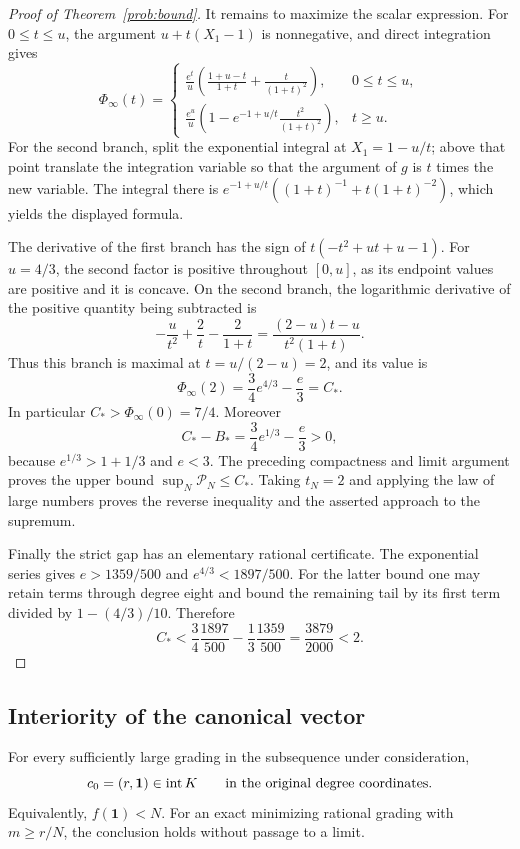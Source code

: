 \begin{proof}[Proof of Theorem~\ref{prob:bound}]
It remains to maximize the scalar expression. For $0\le t\le u$,
the argument $u+t(X_1-1)$ is nonnegative, and direct integration gives
\begin{equation}\label{prob:scalar-formula}
 \Phi_\infty(t)=
 \begin{cases}
 \displaystyle\frac{e^t}{u}
       \left(\frac{1+u-t}{1+t}+\frac{t}{(1+t)^2}\right),
                                      &0\le t\le u,\\[7pt]
 \displaystyle\frac{e^u}{u}
       \left(1-e^{-1+u/t}\frac{t^2}{(1+t)^2}\right),
                                      &t\ge u.
 \end{cases}
\end{equation}
For the second branch, split the exponential integral at
$X_1=1-u/t$; above that point translate the integration variable so
that the argument of $g$ is $t$ times the new variable. The integral
there is
$e^{-1+u/t}((1+t)^{-1}+t(1+t)^{-2})$, which yields the displayed
formula.

The derivative of the first branch has the sign of
$t(-t^2+ut+u-1)$. For $u=4/3$, the second factor is positive throughout
$[0,u]$, as its endpoint values are positive and it is concave. On the
second branch, the logarithmic derivative of the positive quantity
being subtracted is
\[
 -\frac u{t^2}+\frac2t-\frac2{1+t}
       =\frac{(2-u)t-u}{t^2(1+t)}.
\]
Thus this branch is maximal at $t=u/(2-u)=2$, and its value is
\[
 \Phi_\infty(2)=\frac34e^{4/3}-\frac e3=C_*.
\]
In particular $C_*>\Phi_\infty(0)=7/4$. Moreover
\[
 C_*-B_*=\frac34e^{1/3}-\frac e3>0,
\]
because $e^{1/3}>1+1/3$ and $e<3$. The preceding compactness and
limit argument proves the upper bound $\sup_N\mathcal P_N\le C_*$.
Taking $t_N=2$ and applying the law of large numbers proves the reverse
inequality and the asserted approach to the supremum.

Finally the strict gap has an elementary rational certificate. The
exponential series gives $e>1359/500$ and $e^{4/3}<1897/500$.
For the latter bound one may retain terms through degree eight and
bound the remaining tail by its first term divided by
$1-(4/3)/10$. Therefore
\[
 C_*<\frac34\frac{1897}{500}-\frac13\frac{1359}{500}
     =\frac{3879}{2000}<2.
\]
\end{proof}

\subsection{Interiority of the canonical vector}

\begin{theorem}\label{jet:interior}
For every sufficiently large grading in the subsequence under
consideration,
\begin{equation}\label{jet:interior-conclusion}
 c_0=(r,\mathbf1)\in\operatorname{int} K
                 \qquad\text{in the original degree coordinates}.
\end{equation}
Equivalently, $f(\mathbf1)<N$. For an exact minimizing rational grading
with $m\ge r/N$, the conclusion holds without passage to a limit.
\end{theorem}

